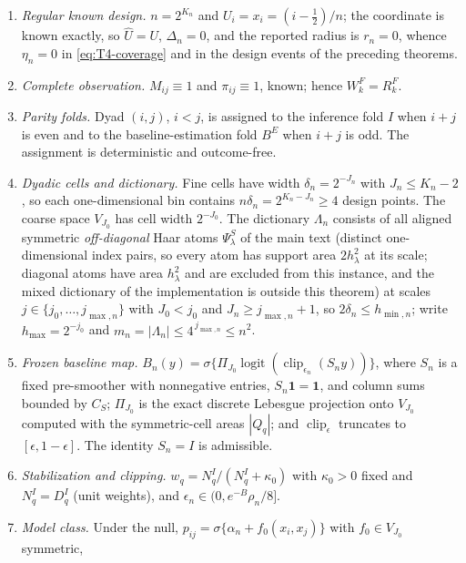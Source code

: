 \documentclass[11pt]{article}
\theoremstyle{definition}
\newcommand{\1}{\mathbf 1}\newcommand{\op}{\operatorname}
\begin{document}
\begin{enumerate}[label=(S\arabic*),leftmargin=2.4em,itemsep=2pt]
\item\label{S:design} \emph{Regular known design.}  $n=2^{K_n}$ and
$U_i=x_i=(i-\tfrac12)/n$; the coordinate is known exactly, so
$\widehat U=U$, $\Delta_n=0$, and the reported radius is $r_n=0$, whence
$\eta_n=0$ in \eqref{eq:T4-coverage} and in the design events of the preceding
theorems.
\item\label{S:obs} \emph{Complete observation.}  $M_{ij}\equiv1$ and
$\pi_{ij}\equiv1$, known; hence $W_k^F=R_k^F$.
\item\label{S:folds} \emph{Parity folds.}  Dyad $(i,j)$, $i<j$, is assigned to
the inference fold $I$ when $i+j$ is even and to the baseline-estimation fold
$B^E$ when $i+j$ is odd.  The assignment is deterministic and outcome-free.
\item\label{S:cells} \emph{Dyadic cells and dictionary.}  Fine cells have width
$\delta_n=2^{-J_n}$ with $J_n\le K_n-2$, so each one-dimensional bin contains
$n\delta_n=2^{K_n-J_n}\ge4$ design points.  The coarse space $V_{J_0}$ has cell
width $2^{-J_0}$.  The dictionary $\Lambda_n$ consists of all aligned symmetric
\emph{off-diagonal} Haar atoms $\Psi_\lambda^S$ of the main text (distinct
one-dimensional index pairs, so every atom has support area $2h_\lambda^2$ at
its scale; diagonal atoms have area $h_\lambda^2$ and are excluded from this
instance, and the mixed dictionary of the implementation is outside this
theorem) at scales
$j\in\{j_0,\dots,j_{\max,n}\}$ with $J_0<j_0$ and
$J_n\ge j_{\max,n}+1$, so $2\delta_n\le h_{\min,n}$; write
$h_{\max}=2^{-j_0}$ and $m_n=|\Lambda_n|\le4^{\,j_{\max,n}}\le n^2$.
\item\label{S:baseline} \emph{Frozen baseline map.}  $B_n(y)=
\sigma\{\Pi_{J_0}\operatorname{logit}(\operatorname{clip}_{\epsilon_n}(S_ny))\}$,
where $S_n$ is a fixed pre-smoother with nonnegative entries, $S_n\mathbf 1=
\mathbf 1$, and column sums bounded by $C_S$; $\Pi_{J_0}$ is the exact discrete
Lebesgue projection onto $V_{J_0}$ computed with the symmetric-cell areas
$|Q_q|$; and $\operatorname{clip}_{\epsilon}$ truncates to
$[\epsilon,1-\epsilon]$.  The identity $S_n=I$ is admissible.
\item\label{S:stab} \emph{Stabilization and clipping.}  $w_q=N_q^I/(N_q^I+
\kappa_0)$ with $\kappa_0>0$ fixed and $N_q^I=D_q^I$ (unit weights), and
$\epsilon_n\in(0,e^{-B}\rho_n/8]$.
\item\label{S:model} \emph{Model class.}  Under the null,
$p_{ij}=\sigma\{\alpha_n+f_0(x_i,x_j)\}$ with $f_0\in V_{J_0}$ symmetric,

\end{enumerate}
\end{document}
